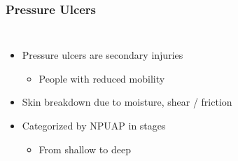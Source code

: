 		\begin{frame}
			\frametitle{Pressure Ulcers}
			\begin{columns}[c]
				\begin{itemize}
					\item Pressure ulcers are secondary injuries
					\begin{itemize}
						\item People with reduced mobility
					\end{itemize}

					\item Skin breakdown due to moisture, shear / friction

					\item Categorized by NPUAP in stages
					\begin{itemize}
						\item From shallow to deep
					\end{itemize}
				\end{itemize}

					\begin{figure}
						\centering



\end{figure}
\end{columns}
\end{frame}
